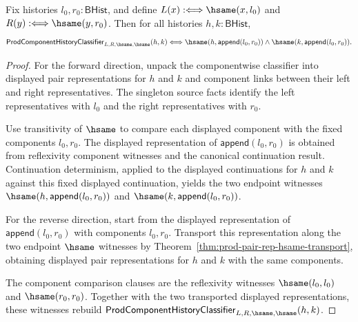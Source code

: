 \begin{theorem}
\label{thm:prod-singleton-componentwise-classifier-endpoint-exactness}
Fix histories $l_0,r_0:\mathsf{BHist}$, and define
$L(x):\Longleftrightarrow\hsame(x,l_0)$ and
$R(y):\Longleftrightarrow\hsame(y,r_0)$. Then for all histories
$h,k:\mathsf{BHist}$,
$$
\mathsf{ProdComponentHistoryClassifier}_{L,R,\hsame,\hsame}(h,k)
\Longleftrightarrow
\hsame(h,\mathsf{append}(l_0,r_0))\land
\hsame(k,\mathsf{append}(l_0,r_0)).
$$
\end{theorem}
\begin{proof}
For the forward direction, unpack the componentwise classifier into displayed
pair representations for $h$ and $k$ and component links between their left and
right representatives. The singleton source facts identify the left
representatives with $l_0$ and the right representatives with $r_0$.

Use transitivity of $\hsame$ to compare each displayed component with the fixed
components $l_0,r_0$. The displayed representation of
$\mathsf{append}(l_0,r_0)$ is obtained from reflexivity component witnesses and
the canonical continuation result. Continuation determinism, applied to the
displayed continuations for $h$ and $k$ against this fixed displayed
continuation, yields the two endpoint witnesses
$\hsame(h,\mathsf{append}(l_0,r_0))$ and
$\hsame(k,\mathsf{append}(l_0,r_0))$.

For the reverse direction, start from the displayed representation of
$\mathsf{append}(l_0,r_0)$ with components $l_0,r_0$. Transport this
representation along the two endpoint $\hsame$ witnesses by
Theorem~\ref{thm:prod-pair-rep-hsame-transport}, obtaining displayed pair
representations for $h$ and $k$ with the same components.

The component comparison clauses are the reflexivity witnesses
$\hsame(l_0,l_0)$ and $\hsame(r_0,r_0)$. Together with the two transported
displayed representations, these witnesses rebuild
$\mathsf{ProdComponentHistoryClassifier}_{L,R,\hsame,\hsame}(h,k)$.
\end{proof}

